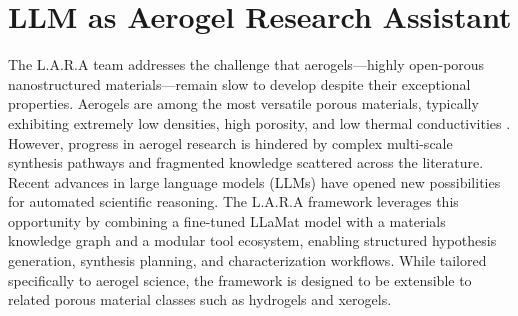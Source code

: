


\section{LLM as Aerogel Research Assistant}

The L.A.R.A team addresses the challenge that aerogels—highly open-porous nanostructured materials—remain slow to develop despite their exceptional properties. Aerogels are among the most versatile porous materials, typically exhibiting extremely low densities, high porosity, and low thermal conductivities \cite{aegerter2011aerogels}. However, progress in aerogel research is hindered by complex multi-scale synthesis pathways and fragmented knowledge scattered across the literature. Recent advances in large language models (LLMs) have opened new possibilities for automated scientific reasoning. The L.A.R.A framework leverages this opportunity by combining a fine-tuned LLaMat model \cite{mishra2025foundationallargelanguagemodels} with a materials knowledge graph and a modular tool ecosystem, enabling structured hypothesis generation, synthesis planning, and characterization workflows. While tailored specifically to aerogel science, the framework is designed to be extensible to related porous material classes such as hydrogels and xerogels.


